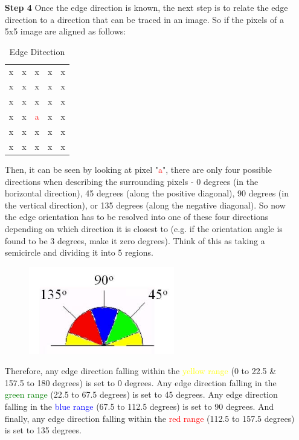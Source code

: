 \begin{enumerate}
\item[\textbf{Step 4}]Once the edge direction is known, the next step is to relate the edge direction to a direction that can be traced in an image. So if the pixels of a 5x5 image are aligned as follows: \\
\begin{table}[H]
\centering
\begin{tabular}{|c c c c c|}
\hline
x & x & x & x & x \\
x & x & x & x & x \\
x & x & x & x & x \\
x & x & \textcolor{red}{a} & x & x \\
x & x & x & x & x \\
x & x & x & x & x \\
\hline
\end{tabular}
\caption {Edge Ditection}
\label {tab:Table1}
\end{table} 
Then, it can be seen by looking at pixel "\textcolor{red}{a}", there are only four possible directions when describing the surrounding pixels - 0 degrees (in the horizontal direction), 45 degrees (along the positive diagonal), 90 degrees (in the vertical direction), or 135 degrees (along the negative diagonal). So now the edge orientation has to be resolved into one of these four directions depending on which direction it is closest to (e.g. if the orientation angle is found to be 3 degrees, make it zero degrees). Think of this as taking a semicircle and dividing it into 5 regions.
\begin{figure}[H]
\centering
\label{fig:Canny1} 
\includegraphics[width=0.6\textwidth]{Canny}
\end{figure}
Therefore, any edge direction falling within the \textcolor{yellow}{yellow range} (0 to 22.5 \& 157.5 to 180 degrees) is set to 0 degrees. Any edge direction falling in the \textcolor{green}{green range} (22.5 to 67.5 degrees) is set to 45 degrees. Any edge direction falling in the \textcolor{blue}{blue range} (67.5 to 112.5 degrees) is set to 90 degrees. And finally, any edge direction falling within the \textcolor{red}{red range} (112.5 to 157.5 degrees) is set to 135 degrees.

\end{enumerate}
